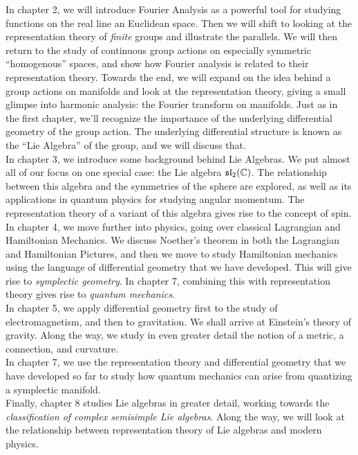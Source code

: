 	In chapter 2, we will introduce Fourier Analysis as a powerful tool for studying functions on the real line an Euclidean space. Then we will shift to looking at the representation theory of \emph{finite} groups and illustrate the parallels. We will then return to the study of continuous group actions on especially symmetric ``homogenous'' spaces, and show how Fourier analysis is related to their representation theory. Towards the end, we will expand on the idea behind a group actions on manifolds and look at the representation theory, giving a small glimpse into harmonic analysis: the Fourier transform on manifolds. Just as in the first chapter, we'll recognize the importance of the underlying differential geometry of the group action. The underlying differential structure is known as the ``Lie Algebra'' of the group, and we will discuss that.\\
	
	In chapter 3, we introduce some background behind Lie Algebras. We put almost all of our focus on one special case: the Lie algebra $\frak{sl}_2 (\mathbb C)$. The relationship between this algebra and the symmetries of the sphere are explored, as well as its applications in quantum physics for studying angular momentum. The representation theory of a variant of this algebra gives rise to the concept of spin. \\
	
	In chapter 4, we move further into physics, going over classical Lagrangian and Hamiltonian Mechanics. We discuss Noether's theorem in both the Lagrangian and Hamiltonian Pictures, and then we move to study Hamiltonian mechanics using the language of differential geometry that we have developed. This will give rise to \emph{symplectic geometry}. In chapter 7, combining this with representation theory gives rise to \emph{quantum mechanics}.\\
	
	In chapter 5, we apply differential geometry first to the study of electromagnetism, and then to gravitation. We shall arrive at Einstein's theory of gravity. Along the way, we study in even greater detail the notion of a metric, a connection, and curvature. \\
	
	In chapter 7, we use the representation theory and differential geometry that we have developed so far to study how quantum mechanics can arise from quantizing a symplectic manifold.\\
	
	Finally, chapter 8 studies Lie algebras in greater detail, working towards the \emph{classification of complex semisimple Lie algebras}. Along the way, we will look at the relationship between representation theory of Lie algebras and modern physics. 
	
	
	
	